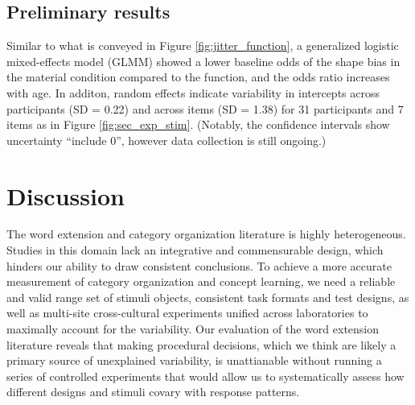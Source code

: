 \documentclass[10pt, letterpaper]{article}
\begin{document}
\hypertarget{preliminary-results}{%
\subsection{Preliminary results}\label{preliminary-results}}

Similar to what is conveyed in Figure \ref{fig:jitter_function}, a
generalized logistic mixed-effects model (GLMM) showed a lower baseline
odds of the shape bias in the material condition compared to the
function, and the odds ratio increases with age. In additon, random
effects indicate variability in intercepts across participants (SD =
0.22) and across items (SD = 1.38) for 31 participants and 7 items as in
Figure \ref{fig:sec_exp_stim}. (Notably, the confidence intervals show
uncertainty ``include 0'', however data collection is still ongoing.)

\hypertarget{discussion-1}{%
\section{Discussion}\label{discussion-1}}

The word extension and category organization literature is highly
heterogeneous. Studies in this domain lack an integrative and
commensurable design, which hinders our ability to draw consistent
conclusions. To achieve a more accurate measurement of category
organization and concept learning, we need a reliable and valid range
set of stimuli objects, consistent task formats and test designs, as
well as multi-site cross-cultural experiments unified across
laboratories to maximally account for the variability. Our evaluation of
the word extension literature reveals that making procedural decisions,
which we think are likely a primary source of unexplained variability,
is unattianable without running a series of controlled experiments that
would allow us to systematically assess how different designs and
stimuli covary with response patterns.
\end{document}
